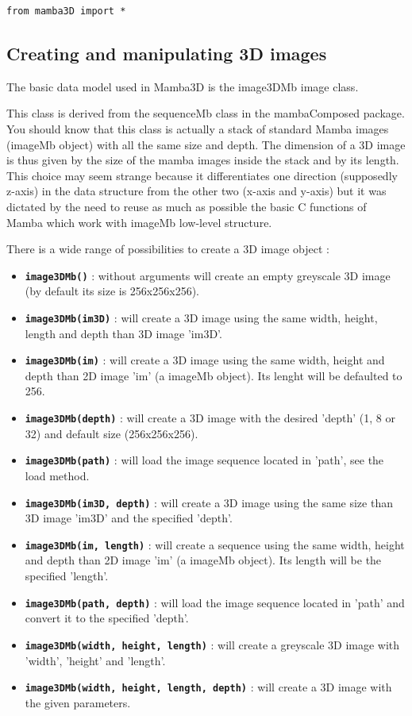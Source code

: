 \documentclass[a4paper,10pt,oneside]{article}
\begin{document}
\lstset{language=Python}
\begin{lstlisting}
from mamba3D import *
\end{lstlisting}

\subsection{Creating and manipulating 3D images}

The basic data model used in Mamba3D is the image3DMb image class.

This class is derived from the sequenceMb class in the mambaComposed package.
You should know that this class is actually a stack of standard Mamba images
(imageMb object) with all the same size and depth. The dimension of a 3D image
is thus given by the size of the mamba images inside the stack and by its
length. This choice may seem strange because it differentiates one direction
(supposedly z-axis) in the data structure from the other two (x-axis and
y-axis) but it was dictated by the need to reuse as much as possible the 
basic C functions of Mamba which work with imageMb low-level structure.

There is a wide range of possibilities to create a 3D image object :
\begin{itemize}
\item \texttt{\textbf{image3DMb()}} : without arguments will create an empty
greyscale 3D image (by default its size is 256x256x256).
\item \texttt{\textbf{image3DMb(im3D)}} : will create a 3D image using the
same width, height, length and depth than 3D image 'im3D'.
\item \texttt{\textbf{image3DMb(im)}} : will create a 3D image using the same
width, height and depth than 2D image 'im' (a imageMb object). Its
lenght will be defaulted to 256.
\item \texttt{\textbf{image3DMb(depth)}} : will create a 3D image with the
desired 'depth' (1, 8 or 32) and default size (256x256x256).
\item \texttt{\textbf{image3DMb(path)}} : will load the image sequence located
in 'path', see the load method.
\item \texttt{\textbf{image3DMb(im3D, depth)}} : will create a 3D image using
the same size than 3D image 'im3D' and the specified 'depth'.
\item \texttt{\textbf{image3DMb(im, length)}} : will create a sequence using
the same width, height and depth than 2D image 'im' (a imageMb object). Its
length will be the specified 'length'.
\item \texttt{\textbf{image3DMb(path, depth)}} : will load the image sequence
located in 'path' and convert it to the specified 'depth'.
\item \texttt{\textbf{image3DMb(width, height, length)}} : will create a 
greyscale 3D image with 'width', 'height' and 'length'.
\item \texttt{\textbf{image3DMb(width, height, length, depth)}} : will create
a 3D image with the given parameters.
\end{itemize}
\end{document}
